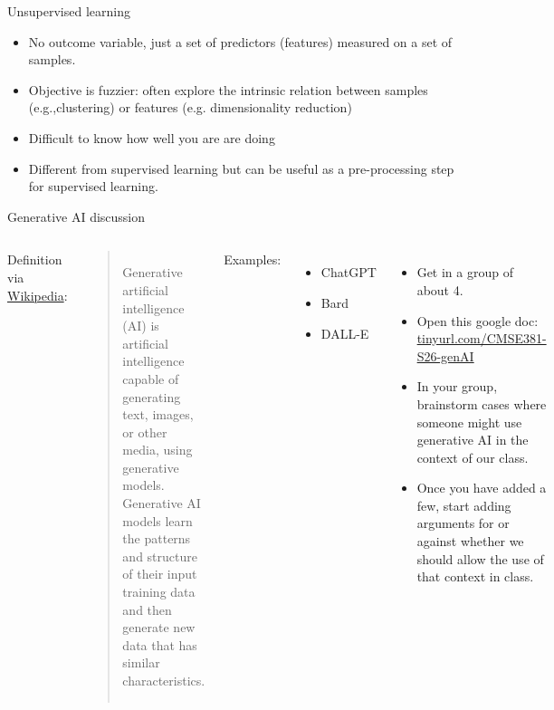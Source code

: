 \documentclass[aspectratio=169,dvipsnames]{beamer}
\begin{document}
\begin{frame}[c]{Unsupervised learning }

\begin{itemize}
	\item
No outcome variable, just a set of predictors (features) measured on a set of samples.

	\item
Objective is fuzzier: often explore the intrinsic relation between samples (e.g.,clustering) or features (e.g. dimensionality reduction)

	\item
Difficult to know how well you are are doing

	\item
Different from supervised learning but can be useful as a pre-processing step for supervised learning.
\end{itemize}

\end{frame}
{
\begin{frame}[t]{Generative AI discussion}
\begin{columns}
Definition via \href{https://en.wikipedia.org/wiki/Generative_artificial_intelligence}{Wikipedia}:\\ 
\begin{quote}
	Generative artificial intelligence (AI) is artificial intelligence capable of generating text, images, or other media, using generative models.
	Generative AI models learn the patterns and structure of their input training data and then generate new data that has similar characteristics.
\end{quote}

Examples:
\begin{itemize}
	\item ChatGPT
	\item Bard
	\item DALL-E
\end{itemize}
\centering
\begin{itemize}
	\item Get in a group of about 4. 
	\item Open this google doc: \href{https://tinyurl.com/CMSE381-S26-genAI}{tinyurl.com/CMSE381-S26-genAI}
	\item In your group, brainstorm cases where someone might use generative AI in the context of our class. 
	\item Once you have added a few, start adding arguments for or against whether we should allow the use of that context in class. 
\end{itemize}
\end{columns}
\end{frame}
}
\end{document}

